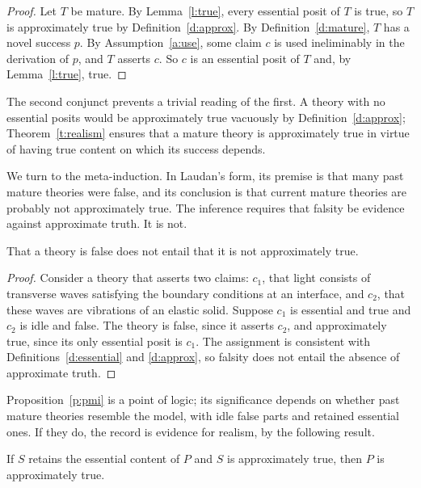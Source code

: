 \documentclass{situationist-preprint}
\begin{document}
\begin{proof}
Let $T$ be mature. By Lemma~\ref{l:true}, every essential posit of $T$ is true, so $T$ is approximately true by Definition~\ref{d:approx}. By Definition~\ref{d:mature}, $T$ has a novel success $p$. By Assumption~\ref{a:use}, some claim $c$ is used ineliminably in the derivation of $p$, and $T$ asserts $c$. So $c$ is an essential posit of $T$ and, by Lemma~\ref{l:true}, true.
\end{proof}

The second conjunct prevents a trivial reading of the first. A theory with no essential posits would be approximately true vacuously by Definition~\ref{d:approx}; Theorem~\ref{t:realism} ensures that a mature theory is approximately true in virtue of having true content on which its success depends.

We turn to the meta-induction. In Laudan's form, its premise is that many past mature theories were false, and its conclusion is that current mature theories are probably not approximately true. The inference requires that falsity be evidence against approximate truth. It is not.

\begin{proposition}\label{p:pmi}
That a theory is false does not entail that it is not approximately true.
\end{proposition}

\begin{proof}
Consider a theory that asserts two claims: $c_1$, that light consists of transverse waves satisfying the boundary conditions at an interface, and $c_2$, that these waves are vibrations of an elastic solid. Suppose $c_1$ is essential and true and $c_2$ is idle and false. The theory is false, since it asserts $c_2$, and approximately true, since its only essential posit is $c_1$. The assignment is consistent with Definitions~\ref{d:essential} and \ref{d:approx}, so falsity does not entail the absence of approximate truth.
\end{proof}

Proposition~\ref{p:pmi} is a point of logic; its significance depends on whether past mature theories resemble the model, with idle false parts and retained essential ones. If they do, the record is evidence for realism, by the following result.

\begin{proposition}\label{p:transfer}
If $S$ retains the essential content of $P$ and $S$ is approximately true, then $P$ is approximately true.
\end{proposition}
\end{document}
